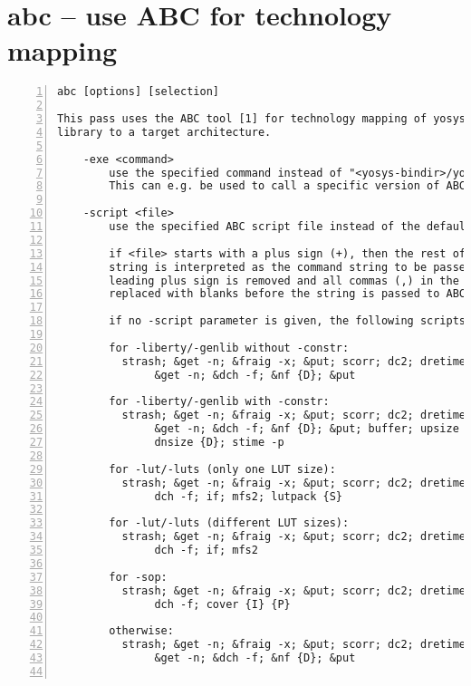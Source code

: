 
\section{abc -- use ABC for technology mapping}
\label{cmd:abc}
\begin{lstlisting}[numbers=left,frame=single]
    abc [options] [selection]

This pass uses the ABC tool [1] for technology mapping of yosys's internal gate
library to a target architecture.

    -exe <command>
        use the specified command instead of "<yosys-bindir>/yosys-abc" to execute ABC.
        This can e.g. be used to call a specific version of ABC or a wrapper.

    -script <file>
        use the specified ABC script file instead of the default script.

        if <file> starts with a plus sign (+), then the rest of the filename
        string is interpreted as the command string to be passed to ABC. The
        leading plus sign is removed and all commas (,) in the string are
        replaced with blanks before the string is passed to ABC.

        if no -script parameter is given, the following scripts are used:

        for -liberty/-genlib without -constr:
          strash; &get -n; &fraig -x; &put; scorr; dc2; dretime; strash;
               &get -n; &dch -f; &nf {D}; &put

        for -liberty/-genlib with -constr:
          strash; &get -n; &fraig -x; &put; scorr; dc2; dretime; strash;
               &get -n; &dch -f; &nf {D}; &put; buffer; upsize {D};
               dnsize {D}; stime -p

        for -lut/-luts (only one LUT size):
          strash; &get -n; &fraig -x; &put; scorr; dc2; dretime; strash;
               dch -f; if; mfs2; lutpack {S}

        for -lut/-luts (different LUT sizes):
          strash; &get -n; &fraig -x; &put; scorr; dc2; dretime; strash;
               dch -f; if; mfs2

        for -sop:
          strash; &get -n; &fraig -x; &put; scorr; dc2; dretime; strash;
               dch -f; cover {I} {P}

        otherwise:
          strash; &get -n; &fraig -x; &put; scorr; dc2; dretime; strash;
               &get -n; &dch -f; &nf {D}; &put


\end{lstlisting}
